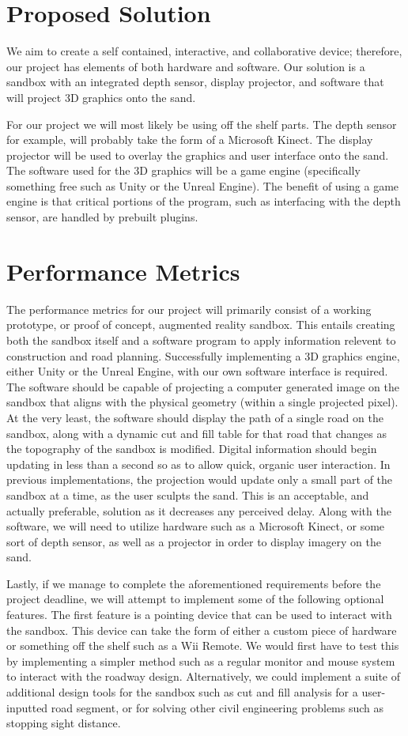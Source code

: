\documentclass[onecolumn, draftclsnofoot,10pt, compsoc]{IEEEtran}
\begin{document}
\section{Proposed Solution}
We aim to create a self contained, interactive, and collaborative device; therefore, our project has elements of both hardware and software.
Our solution is a sandbox with an integrated depth sensor, display projector, and software that will project 3D graphics onto the sand.
\par
For our project we will most likely be using off the shelf parts.
The depth sensor for example, will probably take the form of a Microsoft Kinect.
The display projector will be used to overlay the graphics and user interface onto the sand.
The software used for the 3D graphics will be a game engine (specifically something free such as Unity or the Unreal Engine).
The benefit of using a game engine is that critical portions of the program, such as interfacing with the depth sensor, are handled by prebuilt plugins.

\section{Performance Metrics}
The performance metrics for our project will primarily consist of a working prototype, or proof of concept, augmented reality sandbox.
This entails creating both the sandbox itself and a software program to apply information relevent to construction and road planning. 
Successfully implementing a 3D graphics engine, either Unity or the Unreal Engine, with our own software interface is required.
The software should be capable of projecting a computer generated image on the sandbox that aligns with the physical geometry (within a single projected pixel).
At the very least, the software should display the path of a single road on the sandbox, along with a dynamic cut and fill table for that road that changes as the topography of the sandbox is modified.
Digital information should begin updating in less than a second so as to allow quick, organic user interaction.
In previous implementations, the projection would update only a small part of the sandbox at a time, as the user sculpts the sand. 
This is an acceptable, and actually preferable, solution as it decreases any perceived delay.
Along with the software, we will need to utilize hardware such as a Microsoft Kinect, or some sort of depth sensor, as well as a projector in order to display imagery on the sand.
\par
Lastly, if we manage to complete the aforementioned requirements before the project deadline, we will attempt to implement some of the following optional features.
The first feature is a pointing device that can be used to interact with the sandbox.
This device can take the form of either a custom piece of hardware or something off the shelf such as a Wii Remote.
We would first have to test this by implementing a simpler method such as a regular monitor and mouse system to interact with the roadway design.
Alternatively, we could implement a suite of additional design tools for the sandbox such as cut and fill analysis for a user-inputted road segment, or for solving other civil engineering problems such as stopping sight distance.
\end{document}
